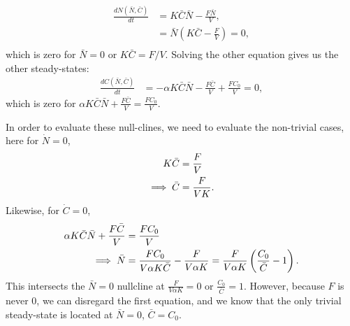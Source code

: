 \begin{align*}
  \frac{dN(\bar{N}, \bar{C})}{dt} &= K\bar{C} \bar{N} - \frac{F\bar{N}}{V}, \\
  &= \bar{N} \left( K\bar{C} - \frac{F}{V} \right) = 0, \\
\end{align*}
which is zero for $\bar{N} = 0$ or $K \bar{C} = F/V$.  Solving the other equation gives us the other steady-states:
\begin{align*}
  \frac{dC(\bar{N}, \bar{C})}{dt} &= -\alpha K \bar{C} \bar{N} - \frac{F\bar{C}}{V} + \frac{FC_0}{V} = 0,
\end{align*}
which is zero for $\alpha K\bar{C} \bar{N} + \frac{F\bar{C}}{V} = \frac{FC_0}{V}$.

In order to evaluate these null-clines, we need to evaluate the non-trivial cases, here for $\dot{N} = 0$,
\begin{align}
  K \bar{C} &= \frac{F}{V} \notag \\
  \implies \bar{C} &= \frac{F}{VK}.
\end{align}
Likewise, for $\dot{C} = 0$,
\begin{align}
  \alpha K \bar{C} \bar{N} + \frac{F\bar{C}}{V} &= \frac{FC_0}{V} \notag \\
  \implies \bar{N} &= \frac{FC_0}{V \alpha K \bar{C}} - \frac{F}{V \alpha K} = \frac{F}{V \alpha K} \left(\frac{C_0}{\bar{C}} - 1 \right).
\end{align}
This intersects the $\bar{N} = 0$ nullcline at $\frac{F}{V\alpha K} = 0$ or $\frac{C_0}{\bar{C}} = 1$.  However, because $F$ is never 0, we can disregard the first equation, and we know that the only trivial steady-state is located at $\bar{N} = 0$, $\bar{C} = C_0$.


